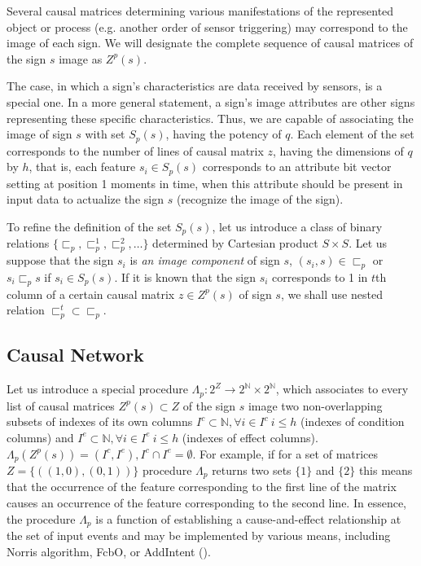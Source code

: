 \documentclass[review]{elsarticle}
\begin{document}
Several causal matrices determining various manifestations of the represented object or process (e.g. another order of sensor triggering) may correspond to the image of each sign. We will designate the complete sequence of causal matrices of the sign $s$ image as $Z^p(s)$. 

The case, in which a sign's characteristics are data received by sensors, is a special one. In a more general statement, a sign's image attributes are other signs representing these specific characteristics. Thus, we are capable of associating the image of sign $s$ with set $S_p(s)$, having the potency of $q$. Each element of the set corresponds to the number of lines of causal matrix $z$, having the dimensions of $q$ by $h$, that is, each feature $s_i\in S_p(s)$ corresponds to an attribute bit vector setting at position 1 moments in time, when this attribute should be present in input data to actualize the sign $s$ (recognize the image of the sign). 

To refine the definition of the set $S_p(s)$, let us introduce a class of binary relations $\{\sqsubset_p,\sqsubset_p^1,\sqsubset_p^2,\dots\}$ determined by Cartesian product $S\times S$. Let us suppose that the sign $s_i$ is \textit{an image component} of sign $s$, $(s_i,s)\in\sqsubset_p$ or $s_i\sqsubset_p s$ if $s_i\in S_p(s)$. If it is known that the sign $s_i$ corresponds to 1 in $t$th column of a certain causal matrix $z\in Z^p(s)$ of sign $s$, we shall use nested relation $\sqsubset_p^t\subset \sqsubset_p$.

\subsection{Causal Network}\label{subsec:causal_net}

Let us introduce a special procedure $\Lambda_p: 2^Z\rightarrow 2^{\mathbb N}\times 2^{\mathbb N}$, which associates to every list of causal matrices $Z^p(s)\subset Z$ of the sign $s$ image two non-overlapping subsets of indexes of its own columns $I^c\subset\mathbb N, \forall i\in I^c\ i\leq h$ (indexes of condition columns) and $I^e\subset\mathbb N, \forall i\in I^e\ i\leq h$ (indexes of effect columns). $\Lambda_p(Z^p(s))=(I^c,I^e), I^c\cap I^e=\emptyset$. For example, if for a set of matrices $Z=\{((1, 0), (0, 1))\}$ procedure $\Lambda_p$ returns two sets $\{1\}$ and $\{2\}$ this means that the occurrence of the feature corresponding to the first line of the matrix causes an occurrence of the feature corresponding to the second line. In essence, the procedure $\Lambda_p$ is a function of establishing a cause-and-effect relationship at the set of input events and may be implemented by various means, including Norris algorithm, FcbO, or AddIntent (\cite{Norris1978,Krajca2010,Merwe2004}).
\end{document}
